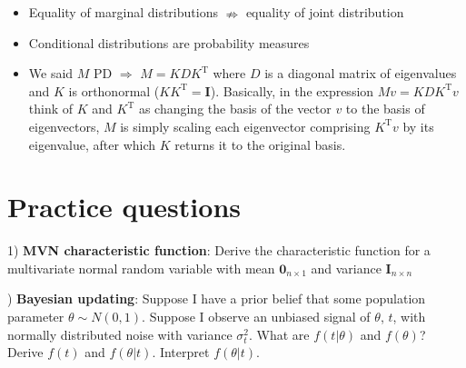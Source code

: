 \documentclass[12pt,english]{article}
\newcommand{\T}{\ensuremath{\text{T}}}
\begin{document}
\begin{itemize}
	\item Equality of marginal distributions $\nRightarrow$ equality of joint distribution
	\item Conditional distributions are probability measures
	\item We said $M$ PD $\Rightarrow$ $M = K D K^{\T}$ where $D$ is a diagonal matrix of eigenvalues and $K$ is orthonormal ($K K^{\T} = \mathbf{I}$). Basically, in the expression $Mv = K D K^{\T}v$ think of $K$ and $K^{\T}$ as changing the basis of the vector $v$ to the basis of eigenvectors, $M$ is simply scaling each eigenvector comprising $K^{\T} v$ by its eigenvalue, after which $K$ returns it to the original basis.
\end{itemize}

\section{Practice questions}

1) \textbf{MVN characteristic function}: Derive the characteristic function for a multivariate normal random variable with mean $\mathbf{0}_{n \times 1}$ and variance $\mathbf{I}_{n \times n}$

\vspace{1em}
) \textbf{Bayesian updating}: Suppose I have a prior belief that some population parameter $\theta \sim N(0, 1)$. Suppose I observe an unbiased signal of $\theta$, $t$, with normally distributed noise with variance $\sigma^{2}_{t}$. What are $f(t | \theta)$ and $f(\theta)$? Derive $f(t)$ and $f(\theta | t)$. Interpret $f(\theta | t)$.
\end{document}
